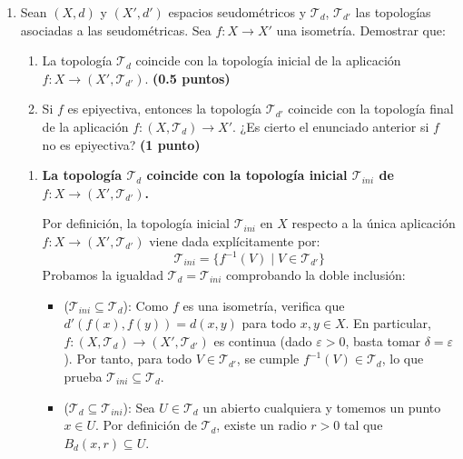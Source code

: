 \begin{enumerate}
    \item Sean $(X, d)$ y $(X', d')$ espacios seudométricos y $\mathcal{T}_d$, $\mathcal{T}_{d'}$ las topologías asociadas a las seudométricas. Sea $f : X \to X'$ una isometría. Demostrar que:
    \begin{enumerate}
        \item La topología $\mathcal{T}_d$ coincide con la topología inicial de la aplicación $f : X \to (X', \mathcal{T}_{d'})$.
        \hfill \textbf{(0.5 puntos)}
        
        \item Si $f$ es epiyectiva, entonces la topología $\mathcal{T}_{d'}$ coincide con la topología final de la aplicación $f : (X, \mathcal{T}_d) \to X'$. ¿Es cierto el enunciado anterior si $f$ no es epiyectiva?
        \hfill \textbf{(1 punto)}
    \end{enumerate}
    \begin{enumerate}
    \item[\textbf{a)}] \textbf{La topología $\mathcal{T}_d$ coincide con la topología inicial $\mathcal{T}_{ini}$ de $f : X \to (X', \mathcal{T}_{d'})$.}
    
    \begin{dem}
        Por definición, la topología inicial $\mathcal{T}_{ini}$ en $X$ respecto a la única aplicación $f : X \to (X', \mathcal{T}_{d'})$ viene dada explícitamente por:
        \[
            \mathcal{T}_{ini} = \{ f^{-1}(V) \mid V \in \mathcal{T}_{d'} \}
        \]
        Probamos la igualdad $\mathcal{T}_d = \mathcal{T}_{ini}$ comprobando la doble inclusión:

        \begin{itemize}
            \item ($\mathcal{T}_{ini} \subseteq \mathcal{T}_d$): Como $f$ es una isometría, verifica que $d'(f(x), f(y)) = d(x, y)$ para todo $x, y \in X$. En particular, $f : (X, \mathcal{T}_d) \to (X', \mathcal{T}_{d'})$ es continua (dado $\varepsilon > 0$, basta tomar $\delta = \varepsilon$). Por tanto, para todo $V \in \mathcal{T}_{d'}$, se cumple $f^{-1}(V) \in \mathcal{T}_d$, lo que prueba $\mathcal{T}_{ini} \subseteq \mathcal{T}_d$.

            \item ($\mathcal{T}_d \subseteq \mathcal{T}_{ini}$): Sea $U \in \mathcal{T}_d$ un abierto cualquiera y tomemos un punto $x \in U$. Por definición de $\mathcal{T}_d$, existe un radio $r > 0$ tal que $B_d(x, r) \subseteq U$. 
            

\end{itemize}
\end{dem}
\end{enumerate}
\end{enumerate}
